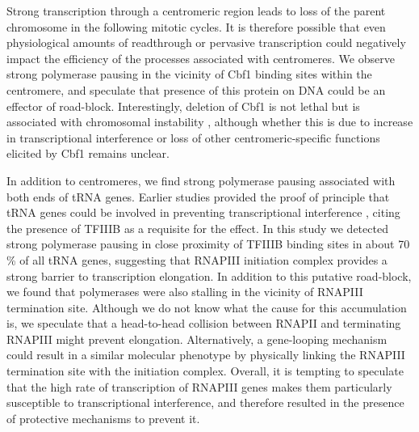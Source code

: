 Strong transcription through a centromeric region leads to loss of the parent chromosome \cite{apostol:1988:copy} in the following mitotic cycles. 
It is therefore possible that even physiological amounts of readthrough or pervasive transcription could negatively impact the efficiency of the processes associated with centromeres. 
We observe strong polymerase pausing in the vicinity of Cbf1 binding sites within the centromere, and speculate that presence of this protein on DNA could be an effector of road-block. 
Interestingly, deletion of Cbf1 is not lethal but is associated with chromosomal instability \cite{cai:1990:yeast}, although whether this is due to increase in transcriptional interference or loss of other centromeric-specific functions elicited by Cbf1 remains unclear.


In addition to centromeres, we find strong polymerase pausing associated with both ends of tRNA genes. 
Earlier studies provided the proof of principle that tRNA genes could be involved in preventing transcriptional interference \cite{korde:2014:intergenic}, citing the presence of TFIIIB as a requisite for the effect. 
In this study we detected strong polymerase pausing in close proximity of TFIIIB binding sites in about 70 \% of all tRNA genes, suggesting that RNAPIII initiation complex provides a strong barrier to transcription elongation. 
In addition to this putative road-block, we found that polymerases were also stalling in the vicinity of RNAPIII termination site. 
Although we do not know what the cause for this accumulation is, we speculate that a head-to-head collision between RNAPII and terminating RNAPIII might prevent elongation. 
Alternatively, a gene-looping mechanism could result in a similar molecular phenotype by physically linking the RNAPIII termination site with the initiation complex. Overall, it is tempting to speculate that the high rate of transcription of RNAPIII genes makes them particularly susceptible to transcriptional interference, and therefore resulted in the presence of protective mechanisms to prevent it.

\clearpage

\newpage
\mbox{}